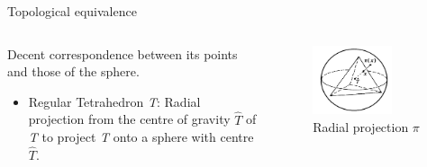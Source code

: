 \documentclass{beamer}
\begin{document}
\begin{frame}{Topological equivalence}
  \begin{columns}
    \begin{column}{0.6\textwidth}
      \begin{block}{}
        Decent correspondence between its points and those of the sphere.
        \begin{itemize}
        \item Regular Tetrahedron \textsl{T}: Radial projection from the centre of gravity $\hat T$ of \textsl{T} to project \textsl{T} onto a sphere with centre $\hat T$.
        \end{itemize}
      \end{block}
    \end{column}
    \begin{column}{0.4\textwidth}
      \begin{figure}
        \centering
        \includegraphics[width=0.7\textwidth]{figure_1_8_a.png}
        \caption{Radial projection $\pi$}
      \end{figure}
    \end{column}
  \end{columns}
\end{frame}
\end{document}
